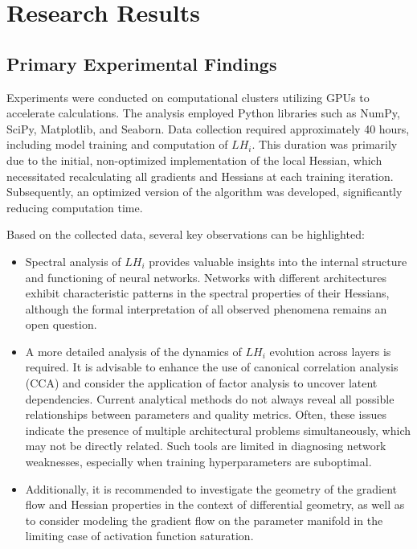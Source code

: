 \documentclass[a4paper,12pt]{article}
\begin{document}
\section{Research Results}

\subsection{Primary Experimental Findings}

Experiments were conducted on computational clusters utilizing GPUs to accelerate calculations. The analysis
employed Python libraries such as NumPy, SciPy, Matplotlib, and Seaborn. Data collection required
approximately 40 hours, including model training and computation of $LH_i$. This duration was primarily due
to the initial, non-optimized implementation of the local Hessian, which necessitated recalculating all
gradients and Hessians at each training iteration. Subsequently, an optimized version of the algorithm was
developed, significantly reducing computation time.

Based on the collected data, several key observations can be highlighted:
\begin{itemize}
  \item Spectral analysis of $LH_i$ provides valuable insights into the internal structure and functioning of
    neural networks. Networks with different architectures exhibit characteristic patterns in the spectral
    properties of their Hessians, although the formal interpretation of all observed phenomena remains an open question.
  \item A more detailed analysis of the dynamics of $LH_i$ evolution across layers is required. It is
    advisable to enhance the use of canonical correlation analysis (CCA) and consider the application of
    factor analysis to uncover latent dependencies. Current analytical methods do not always reveal all
    possible relationships between parameters and quality metrics. Often, these issues indicate the presence
    of multiple architectural problems simultaneously, which may not be directly related. Such tools are
    limited in diagnosing network weaknesses, especially when training hyperparameters are suboptimal.
  \item Additionally, it is recommended to investigate the geometry of the gradient flow and Hessian
    properties in the context of differential geometry, as well as to consider modeling the gradient flow on
    the parameter manifold in the limiting case of activation function saturation.
\end{itemize}
\end{document}
